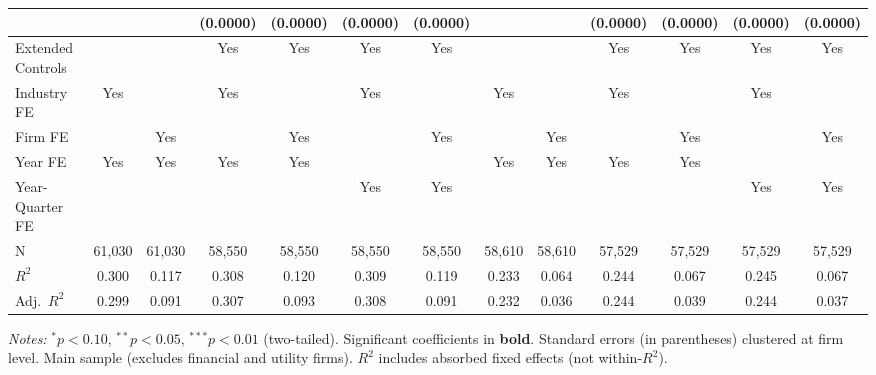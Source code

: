 \documentclass[11pt,a4paper]{article}
\begin{document}
\begin{table}[htbp]
\begin{tabular}{lcccccccccccc}
 &  &  & (0.0000) & (0.0000) & (0.0000) & (0.0000) &  &  & (0.0000) & (0.0000) & (0.0000) & (0.0000) \\
\midrule
Extended Controls &  &  & Yes & Yes & Yes & Yes &  &  & Yes & Yes & Yes & Yes \\
Industry FE & Yes &  & Yes &  & Yes &  & Yes &  & Yes &  & Yes &  \\
Firm FE &  & Yes &  & Yes &  & Yes &  & Yes &  & Yes &  & Yes \\
Year FE & Yes & Yes & Yes & Yes &  &  & Yes & Yes & Yes & Yes &  &  \\
Year-Quarter FE &  &  &  &  & Yes & Yes &  &  &  &  & Yes & Yes \\
\midrule
N & 61,030 & 61,030 & 58,550 & 58,550 & 58,550 & 58,550 & 58,610 & 58,610 & 57,529 & 57,529 & 57,529 & 57,529 \\
$R^2$ & 0.300 & 0.117 & 0.308 & 0.120 & 0.309 & 0.119 & 0.233 & 0.064 & 0.244 & 0.067 & 0.245 & 0.067 \\
Adj.~$R^2$ & 0.299 & 0.091 & 0.307 & 0.093 & 0.308 & 0.091 & 0.232 & 0.036 & 0.244 & 0.039 & 0.244 & 0.037 \\
\bottomrule
\end{tabular}
\begin{minipage}{\linewidth}
\vspace{2pt}\scriptsize
\textit{Notes:} $^{*}p<0.10$, $^{**}p<0.05$, $^{***}p<0.01$ (two-tailed).
 Significant coefficients in \textbf{bold}.
 Standard errors (in parentheses) clustered at firm level.
 Main sample (excludes financial and utility firms).
 $R^2$ includes absorbed fixed effects (not within-$R^2$).
\end{minipage}
\end{table}
\clearpage
\end{document}
